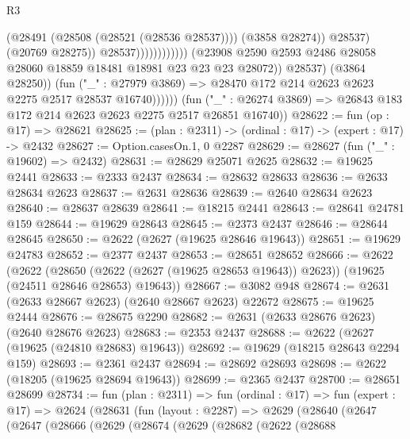 \begin{lexlean}{R3}
\begin{coremodule}
                                                    (@28491 (@28508 (@28521 (@28536 @28537))))
                                                    (@3858 @28274))
                                                  @28537)
                                                (@20769 @28275))
                                              @28537))))))))))))
                      (@23908
                        @2590
                        @2593
                        @2486
                        @28058
                        @28060
                        @18859
                        @18481
                        @18981
                        @23
                        @23
                        @23
                        @28072))
                    @28537)
                  (@3864 @28250))
                (fun ("_" : @27979 @3869) =>
                @28470 @172 @214 @2623 @2623 @2275 @2517 @28537 @16740))))))
      (fun ("_" : @26274 @3869) => @26843 @183 @172 @214 @2623 @2623 @2275 @2517 @26851 @16740))
@28622 := fun (op : @17) => @28621
@28625 := (plan : @2311) -> (ordinal : @17) -> (expert : @17) -> @2432
@28627 := Option.casesOn.{1, 0} @2287
@28629 := @28627 (fun ("_" : @19602) => @2432)
@28631 := @28629 @25071 @2625
@28632 := @19625 @2441
@28633 := @2333 @2437
@28634 := @28632 @28633
@28636 := @2633 @28634 @2623
@28637 := @2631 @28636
@28639 := @2640 @28634 @2623
@28640 := @28637 @28639
@28641 := @18215 @2441
@28643 := @28641 @24781 @159
@28644 := @19629 @28643
@28645 := @2373 @2437
@28646 := @28644 @28645
@28650 := @2622 (@2627 (@19625 @28646 @19643))
@28651 := @19629 @24783
@28652 := @2377 @2437
@28653 := @28651 @28652
@28666 := @2622
    (@2622
      (@28650 (@2622 (@2627 (@19625 @28653 @19643)) @2623))
      (@19625 (@24511 @28646 @28653) @19643))
@28667 := @3082 @948
@28674 := @2631 (@2633 @28667 @2623) (@2640 @28667 @2623) @22672
@28675 := @19625 @2444
@28676 := @28675 @2290
@28682 := @2631 (@2633 @28676 @2623) (@2640 @28676 @2623)
@28683 := @2353 @2437
@28688 := @2622 (@2627 (@19625 (@24810 @28683) @19643))
@28692 := @19629 (@18215 @28643 @2294 @159)
@28693 := @2361 @2437
@28694 := @28692 @28693
@28698 := @2622 (@18205 (@19625 @28694 @19643))
@28699 := @2365 @2437
@28700 := @28651 @28699
@28734 := fun (plan : @2311) =>
  fun (ordinal : @17) =>
  fun (expert : @17) =>
  @2624
    (@28631
      (fun (layout : @2287) =>
      @2629
        (@28640
          (@2647
            (@2647
              (@28666
                (@2629
                  (@28674
                    (@2629
                      (@28682
                        (@2622
                          (@28688

\end{coremodule}
\end{lexlean}
